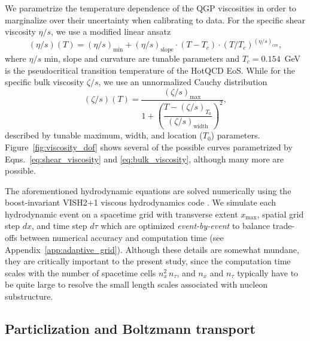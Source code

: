 \documentclass[aps,prc,reprint,amsmath,nofootinbib]{revtex4-1}
\begin{document}
We parametrize the temperature dependence of the QGP viscosities in order to marginalize over their uncertainty when calibrating to data.
For the specific shear viscosity $\eta/s$, we use a modified linear ansatz
\begin{equation}
  \label{eq:shear_viscosity}
  (\eta/s)(T) = (\eta/s)_\mathrm{min} + (\eta/s)_\mathrm{slope}\cdot(T - T_c)\cdot(T/T_c)^{(\eta/s)_\mathrm{crv}},
\end{equation}
where $\eta/s$ min, slope and curvature are tunable parameters and $T_c=0.154$~GeV is the pseudocritical transition temperature of the HotQCD EoS.
While for the specific bulk viscosity $\zeta/s$, we use an unnormalized Cauchy distribution
\begin{equation}
  \label{eq:bulk_viscosity}
  (\zeta/s)(T) = \frac{(\zeta/s)_\mathrm{max}}{1 + \left(\dfrac{T - (\zeta/s)_{T_0}}{(\zeta/s)_\mathrm{width}}\right)^2},
\end{equation}
described by tunable maximum, width, and location ($T_0$) parameters.
Figure~\ref{fig:viscosity_dof} shows several of the possible curves parametrized by Eqns.~\eqref{eq:shear_viscosity} and \eqref{eq:bulk_viscosity}, although many more are possible.

The aforementioned hydrodynamic equations are solved numerically using the boost-invariant \textsc{VISH2+1} viscous hydrodynamics code \cite{Song:2007ux, Shen:2014vra}.
We simulate each hydrodynamic event on a spacetime grid with transverse extent $x_\mathrm{max}$, spatial grid step $dx$, and time step $d\tau$ which are optimized \emph{event-by-event} to balance trade-offs between numerical accuracy and computation time (see Appendix~\ref{app:adaptive_grid}).
Although these details are somewhat mundane, they are critically important to the present study, since the computation time scales with the number of spacetime cells $n_x^2\, n_\tau$, and $n_x$ and $n_\tau$ typically have to be quite large to resolve the small length scales associated with nucleon substructure.

\subsection{Particlization and Boltzmann transport}
\end{document}
